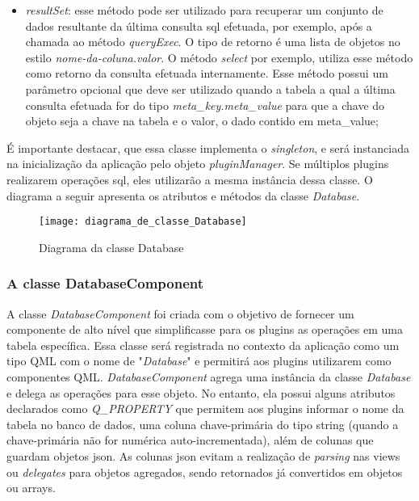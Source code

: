 \begin{itemize}
	\item \textit{resultSet}: esse método pode ser utilizado para recuperar um conjunto de dados resultante da última consulta sql efetuada, por exemplo, após a chamada ao método \textit{queryExec}. O tipo de retorno é uma lista de objetos no estilo \textit{nome-da-coluna.valor}. O método \textit{select} por exemplo, utiliza esse método como retorno da consulta efetuada internamente. Esse método possui um parâmetro opcional que deve ser utilizado quando a tabela a qual a última consulta efetuada for do tipo \textit{meta\_key.meta\_value} para que a chave do objeto seja a chave na tabela e o valor, o dado contido em meta\_value;
\end{itemize}

É importante destacar, que essa classe implementa o \textit{singleton}, e será instanciada na inicialização da aplicação pelo objeto \textit{pluginManager}. Se múltiplos plugins realizarem operações sql, eles utilizarão a mesma instância dessa classe. O diagrama a seguir apresenta os atributos e métodos da classe \textit{Database}.

\begin{figure}[h]
	\texttt{[image: diagrama\_de\_classe\_Database]}
	\centering
	\caption{Diagrama da classe Database}
\end{figure}

\subsubsection{A classe DatabaseComponent}\label{sec:solucao-desenvolvida}
A classe \textit{DatabaseComponent} foi criada com o objetivo de fornecer um componente de alto nível que simplificasse para os plugins as operações em uma tabela específica. Essa classe será registrada no contexto da aplicação como um tipo QML com o nome de "\textit{Database}" e permitirá aos plugins utilizarem como componentes QML. \textit{DatabaseComponent} agrega uma instância da classe \textit{Database} e delega as operações para esse objeto. No entanto, ela possui alguns atributos declarados como \textit{Q\_PROPERTY} que permitem aos plugins informar o nome da tabela no banco de dados, uma coluna chave-primária do tipo string (quando a chave-primária não for numérica auto-incrementada), além de colunas que guardam objetos json. As colunas json evitam a realização de \textit{parsing} nas views ou \textit{delegates} para objetos agregados, sendo retornados já convertidos em objetos ou arrays.\par

